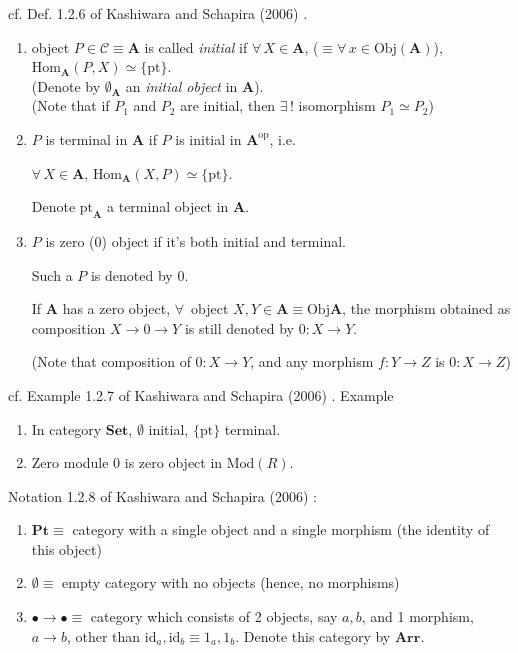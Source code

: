 cf. Def. 1.2.6 of Kashiwara and Schapira (2006) \cite{agat:KaSch2006}.

\begin{definition}
	\begin{enumerate}
		\item object $P \in \mathcal{C} \equiv \mathbf{A}$ is called \emph{initial} if $\forall \, X \in \mathbf{A}$, ($\equiv \forall \, x \in \text{Obj}(\mathbf{A})$), $\text{Hom}_{\mathbf{A}}(P, X) \simeq \lbrace \text{pt} \rbrace$. \\
		(Denote by $\emptyset_{\mathbf{A}}$ an \emph{initial object} in $\mathbf{A}$). \\
		(Note that if $P_1$ and $P_2$ are initial, then $\exists \, !$ isomorphism $P_1 \simeq P_2$)
		\item $P$ is terminal in $\mathbf{A}$ if $P$ is initial in $\mathbf{A}^{\text{op}}$, i.e. 
		
		$\forall \, X \in \mathbf{A}$, $\text{Hom}_{\mathbf{A}}(X, P) \simeq \lbrace \text{pt} \rbrace$. 
		
		Denote $\text{pt}_{\mathbf{A}}$ a terminal object in $\mathbf{A}$. 
		\item $P$ is zero ($0$) object if it's both initial and terminal. 
		
		Such a $P$ is denoted by $0$.
		
		If $\mathbf{A}$ has a zero object, $\forall \, $ object $X, Y \in \mathbf{A} \equiv \text{Obj}\mathbf{A}$, the morphism obtained as composition $X\to 0 \to Y$ is still denoted by $0: X\to Y$.
		
		(Note that composition of $0:X \to Y$, and any morphism $f:Y \to Z$ is $0:X \to Z$)
	\end{enumerate}
\end{definition}

cf. Example 1.2.7 of Kashiwara and Schapira (2006) \cite{agat:KaSch2006}. 
Example 
\begin{enumerate}
	\item[(i)] In category $\mathbf{Set}$, $\emptyset$ initial, $\lbrace \text{pt} \rbrace$ terminal. 
	\item[(ii)] Zero module $0$ is zero object in $\text{Mod}(R)$.
\end{enumerate}

Notation 1.2.8 of Kashiwara and Schapira (2006) \cite{agat:KaSch2006}:
\begin{enumerate}
	\item $\mathbf{Pt} \equiv $ category with a single object and a single morphism (the identity of this object)
	\item $\emptyset \equiv $ empty category with no objects (hence, no morphisms)
	\item $\bullet \to \bullet \equiv$ category which consists of 2 objects, say $a,b$, and 1 morphism, $a\to b$, other than $\text{id}_a, \text{id}_b \equiv 1_a, 1_b$. Denote this category by $\mathbf{Arr}$.  
\end{enumerate}

